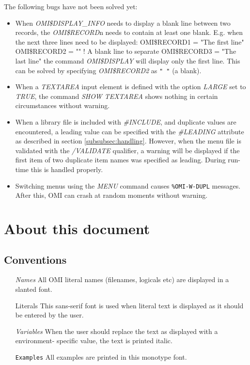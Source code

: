 \documentclass[a4paper]{book}
\renewcommand{\indent}{\hspace*{5mm}}
\begin{document}
The following bugs have not been solved yet: \\
\begin{itemize}
\item When \textsl{OMI{\$}DISPLAY{\_}INFO} needs to display a blank line between two 
records, the \textsl{OMI{\$}RECORD}n needs to contain at least one blank. \newline
E.g. when the next three lines need to be displayed:\newline
\indent\textsf{OMI{\$}RECORD1 = "The first line"} \newline
\indent\textsf{OMI{\$}RECORD2 = "" ! A blank line to separate} \newline
\indent\textsf{OMI{\$}RECORD3 = "The last line"} \newline
the command \textsl{OMI{\$}DISPLAY} will display only the first line. This can be 
solved by specifying \textsl{OMI{\$}RECORD2} as \verb*|" "| (a blank).
\item When a \textsl{TEXTAREA} input element is defined with the option \textsl{LARGE} set to \textsl{TRUE}, 
the command \textsl{SHOW TEXTAREA} shows nothing in certain circumstances without 
warning.
\item When a library file is included with \textsl{{\#}INCLUDE}, and duplicate values are 
encountered, a leading value can be specified with the \textsl{{\#}LEADING} attribute 
as described in section \ref{subsubsec:handling}. However, when the 
menu file is validated with the \textsl{/VALIDATE} qualifier, a warning will be 
displayed if the first item of two duplicate item names was specified as 
leading. During run-time this is handled properly.
\item Switching menus using the \textsl{MENU} command causes \texttt{\%OMI-W-DUPL}
messages. After this, OMI can crash at random moments without warning.
\end{itemize}

\section*{About this document}

\subsection*{Conventions}

\begin{itemize}
\item[\textsl{Names}] All OMI literal names (filenames, logicals etc) are
displayed in a slanted font.
\item[\textsf{Literals}] This sans-serif font is used when literal text is
displayed as it should be entered by the user.
\item[\textsf{\textit{Variables}}] When the user should replace the text as
displayed with a environment- specific value, the text is printed italic.
\item[\texttt{Examples}] All examples are printed in this monotype font.
\end{itemize}
\end{document}
